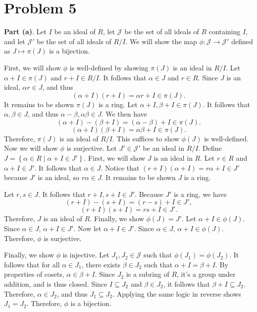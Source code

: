 \documentclass[11pt, letterpaper]{report}
\begin{document}
\section*{Problem 5}
\textbf{Part (a)}. Let $I$ be an ideal of $R$, let $\mathcal{J} $ be the set of all ideals of $R$ containing $I$, and let $\mathcal{J}'$ be the set of all ideals of $R /I$. We will show the map $\phi : \mathcal{J}  \to \mathcal{J} '$ defined as $J\mapsto \pi (J)$ is a bijection.

First, we will show $\phi $ is well-defined by showing $\pi (J)$ is an ideal in $R /I$. Let $\alpha +I \in\pi (J)$ and $r+I\in R /I$. It follows that $\alpha \in J$ and $r\in R$. Since $J$ is an ideal, $\alpha r\in J$, and thus
\[
	\left( \alpha +I \right) \left( r+I \right) =\alpha r+I\in \pi (J)
.\]
It remains to be shown $\pi (J)$ is a ring. Let $\alpha +I,\beta +I\in \pi (J)$. It follows that $\alpha ,\beta \in J$, and thus $\alpha -\beta ,\alpha \beta \in J$. We then have
\[
	\left( \alpha +I \right) -\left( \beta +I \right) =\left( \alpha -\beta  \right) +I\in \pi (J)
.\]
\[
	\left( \alpha +I \right) \left( \beta +I \right) =\alpha \beta +I\in \pi (J)
.\]
Therefore, $\pi (J)$ is an ideal of $R /I$. This suffices to show $\phi  (J)$ is well-defined. Now we will show $\phi $ is surjective. Let $J'\in \mathcal{J} '$ be an ideal in $R /I$. Define  $J=\left\{ \alpha \in R \mid \alpha +I\in J' \right\} $. First, we will show  $J$ is an ideal in $R$. Let $r\in R$ and $\alpha +I\in J'$. It follows that $\alpha \in J$. Notice that $\left( r+I \right) \left( \alpha +I \right) =r\alpha +I\in J'$ because $J'$ is an ideal, so $r\alpha \in J$. It remains to be shown $J$ is a ring.

Let $r,s\in J$. It follows that $r+I,s+I\in J'$. Because $J'$ is a ring, we have
\[
	\left( r+I \right) -\left( s+I \right) =\left( r-s \right) +I\in J'
,\]
\[
	\left( r+I \right) \left( s+I \right) =rs+I\in J'
.\]
Therefore, $J$ is an ideal of $R$. Finally, we show $\phi(J)=J'$. Let $ \alpha +I\in \phi (J)$. Since $\alpha \in J$, $\alpha +I\in J'$. Now let $\alpha+I \in J'$. Since $\alpha \in J$, $\alpha +I\in \phi (J)$. Therefore, $\phi $ is surjective.

Finally, we show $\phi $ is injective. Let $J_1,J_2\in \mathcal{J} $ such that $\phi (J_1)=\phi (J_2)$. It follows that for all $\alpha \in J_1$, there exists $\beta \in J_2$ such that $\alpha +I=\beta +I$. By properties of cosets, $\alpha \in \beta +I$. Since $J_2$ is a subring of $R$, it's a group under addition, and is thus closed. Since $I\subseteq J_2$ and $\beta \in J_2$, it follows that $\beta +I \subseteq J_2$. Therefore, $\alpha \in J_2$, and thus $J_1 \subseteq J_2$. Applying the same logic in reverse shows $J_1=J_2$. Therefore, $\phi $ is a bijection.
\end{document}
